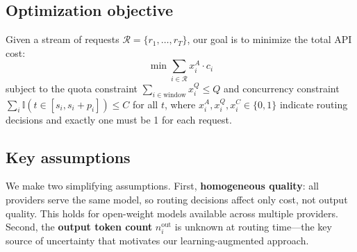 \subsection{Optimization objective}
\label{sec:objective}
Given a stream of requests $\mathcal{R} = \{r_1, \dots, r_T\}$, our goal is to minimize the total API cost:
\[
\min \sum_{i \in \mathcal{R}} x_i^A \cdot c_i
\]
subject to the quota constraint $\sum_{i \in \text{window}} x_i^Q \le Q$ and concurrency constraint $\sum_i \mathbb{I}(t \in [s_i, s_i+p_i]) \le C$ for all $t$, where $x_i^A, x_i^Q, x_i^C \in \{0, 1\}$ indicate routing decisions and exactly one must be 1 for each request.

\subsection{Key assumptions}
\label{sec:assumptions}
We make two simplifying assumptions.
First, \textbf{homogeneous quality}: all providers serve the same model, so routing decisions affect only cost, not output quality. This holds for open-weight models available across multiple providers.
Second, the \textbf{output token count} $n_i^{\text{out}}$ is unknown at routing time---the key source of uncertainty that motivates our learning-augmented approach.
